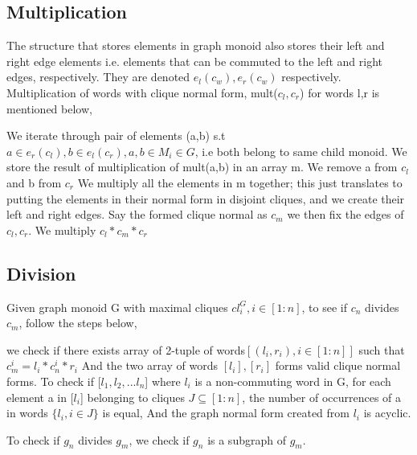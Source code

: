 \subsection{Multiplication}
The structure that stores elements in graph monoid also stores their left and right edge elements i.e. elements that can be commuted to the left and right edges, respectively. They are denoted $e_l(c_w),e_r(c_w)$ respectively.  Multiplication of words with clique normal form, mult($c_l,c_r$) for words l,r is mentioned below,
\begin{outline}
    \1 We iterate through pair of elements (a,b) s.t $a \in e_r(c_l),b \in e_l(c_r), a,b \in M_i \in G$, i.e both belong to same child monoid.
    \1 We store the result of multiplication of mult(a,b) in an array m.
    \1 We remove a from $c_l$ and b from $c_r$
    \1 We multiply all the elements in m together; this just translates to putting the elements in their normal form in disjoint cliques, and we create their left and right edges. Say the formed clique normal as $c_m$
    \1 we then fix the edges of $c_l,c_r$.
    \1 We multiply $c_l*c_m*c_r$
\end{outline}
\subsection{Division}
Given graph monoid G with maximal cliques $ cl_i^G, i \in [1:n]$, to see if $c_n$ divides $c_m$, follow the steps below,
\begin{outline}
    \1 we check if there exists array of 2-tuple of words$[(l_i,r_i), i \in [1:n]]$ such that $c_m^i=l_i*c_n^i*r_i$
    \1 And the two array of words $[l_i],[r_i]$ forms valid clique normal forms.
    \2 To check if [$l_1,l_2,...l_n$] where $l_i$ is a non-commuting word in G, for each element a in [$l_i$] belonging to cliques $J \subseteq [1:n]$, the number of occurrences of a in words $\{l_i, i \in J\}$ is equal,
    \2 And the graph normal form created from $l_i$ is acyclic.
\end{outline}
To check if $g_n$ divides $g_m$, we check if $g_n$ is a subgraph of $g_m$.